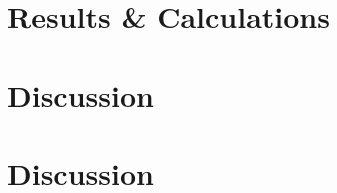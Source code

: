 \documentclass[fleqn,titlepage]{article}
\begin{document}
\newpage
\section{Results \& Calculations}

\newpage
\section{Discussion}

\newpage
\section{Discussion}
\end{document}
